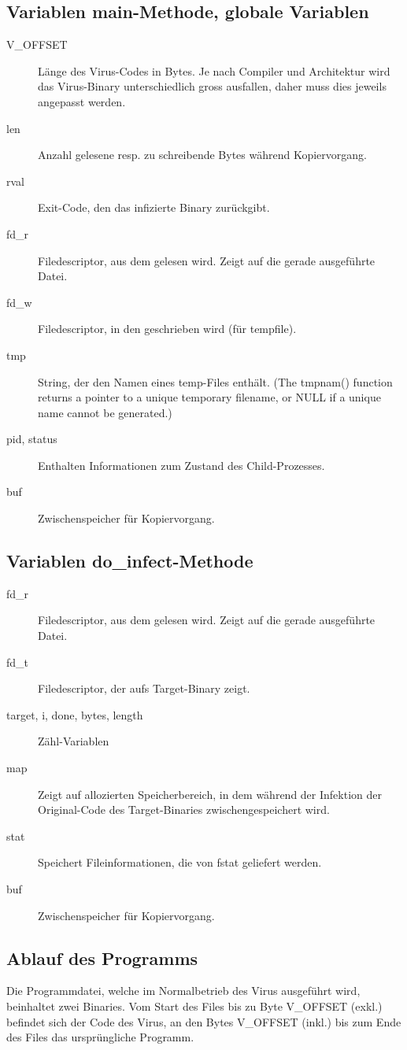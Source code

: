 \documentclass[a4paper,11pt,parskip=half]{scrartcl}
\begin{document}
\subsection{Variablen main-Methode, globale Variablen}
\begin{description}
	\item[V\_OFFSET] Länge des Virus-Codes in Bytes. Je nach Compiler und Architektur wird das Virus-Binary unterschiedlich gross ausfallen, daher muss dies jeweils angepasst werden.
	\item[len] Anzahl gelesene resp. zu schreibende Bytes während Kopiervorgang.
	\item[rval] Exit-Code, den das infizierte Binary zurückgibt.
	\item[fd\_r] Filedescriptor, aus dem gelesen wird. Zeigt auf die gerade ausgeführte Datei.
	\item[fd\_w] Filedescriptor, in den geschrieben wird (für tempfile).
	\item[tmp] String, der den Namen eines temp-Files enthält. (\glqq{}The tmpnam() function returns a pointer to a unique temporary filename, or NULL if a unique name cannot be generated.\grqq{})
	\item[pid, status] Enthalten Informationen zum Zustand des Child-Prozesses.
	\item[buf] Zwischenspeicher für Kopiervorgang.
\end{description}

\subsection{Variablen do\_infect-Methode}
\begin{description}
	\item[fd\_r] Filedescriptor, aus dem gelesen wird. Zeigt auf die gerade ausgeführte Datei.
	\item[fd\_t] Filedescriptor, der aufs Target-Binary zeigt.
	\item[target, i, done, bytes, length] Zähl-Variablen
	\item[map] Zeigt auf allozierten Speicherbereich, in dem während der Infektion der Original-Code des Target-Binaries zwischengespeichert wird.
	\item[stat] Speichert Fileinformationen, die von fstat geliefert werden.
	\item[buf] Zwischenspeicher für Kopiervorgang.
\end{description}

\subsection{Ablauf des Programms}
Die Programmdatei, welche im \glqq{}Normalbetrieb\grqq{} des Virus ausgeführt wird, beinhaltet zwei Binaries. Vom Start des Files bis zu Byte V\_OFFSET (exkl.) befindet sich der Code des Virus, an den Bytes V\_OFFSET (inkl.) bis zum Ende des Files das ursprüngliche Programm.
\end{document}
